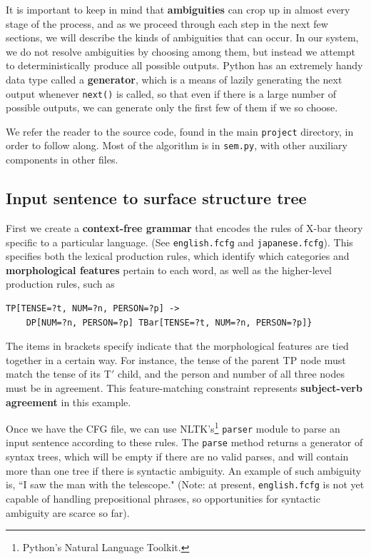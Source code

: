 \documentclass[11pt, oneside]{article}      %
\begin{document}
It is important to keep in mind that \textbf{ambiguities} can crop up in almost every stage of the process, and as we proceed through each step in the next few sections, we will describe the kinds of ambiguities that can occur.  In our system, we do not resolve ambiguities by choosing among them, but instead we attempt to deterministically produce all possible outputs.  Python has an extremely handy data type called a \textbf{generator}, which is a means of lazily generating the next output whenever \texttt{next()} is called, so that even if there is a large number of possible outputs, we can generate only the first few of them if we so choose. 

We refer the reader to the source code, found in the main \texttt{project} directory, in order to follow along.  Most of the algorithm is in \texttt{sem.py}, with other auxiliary components in other files.

\subsection{Input sentence to surface structure tree}

First we create a \textbf{context-free grammar} that encodes the rules of X-bar theory specific to a particular language.  (See \texttt{english.fcfg} and \texttt{japanese.fcfg}).  This specifies both the lexical production rules, which identify which categories and \textbf{morphological features} pertain to each word, as well as the higher-level production rules, such as
\begin{verbatim}
TP[TENSE=?t, NUM=?n, PERSON=?p] -> 
    DP[NUM=?n, PERSON=?p] TBar[TENSE=?t, NUM=?n, PERSON=?p]}
\end{verbatim}
The items in brackets specify indicate that the morphological features are tied together in a certain way.  For instance, the tense of the parent TP node must match the tense of its T$'$ child, and the person and number of all three nodes must be in agreement.  This feature-matching constraint represents \textbf{subject-verb agreement} in this example.

Once we have the CFG file, we can use NLTK's\footnote{Python's Natural Language Toolkit.} \texttt{parser} module to parse an input sentence according to these rules.  The \texttt{parse} method returns a generator of syntax trees, which will be empty if there are no valid parses, and will contain more than one tree if there is syntactic ambiguity.  An example of such ambiguity is, ``I saw the man with the telescope."  (Note: at present, \texttt{english.fcfg} is not yet capable of handling prepositional phrases, so opportunities for syntactic ambiguity are scarce so far).
\end{document}
